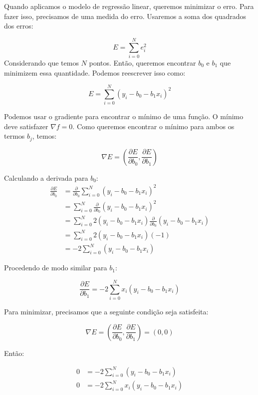 Quando aplicamos o modelo de regressão linear, queremos minimizar o erro. Para fazer isso, precisamos de uma medida do erro. Usaremos a soma dos quadrados dos erros:

$$E=\sum_{i=0}^{N}e_{i}^{2}$$
Considerando que temos $N$ pontos. Então, queremos encontrar $b_{0}$ e $b_{1}$ que minimizem essa quantidade. Podemos reescrever isso como:

$$E=\sum_{i=0}^{N}\left(y_{i}-b_{0}-b_{1}x_{i}\right)^{2}$$

Podemos usar o gradiente para encontrar o mínimo de uma função. O mínimo deve satisfazer $\nabla f=0$. Como queremos encontrar o mínimo para ambos os termos $b_j$, temos:

$$\nabla E=\left(\frac{\partial E}{\partial b_{0}},\frac{\partial E}{\partial b_{1}}\right)$$

Calculando a derivada para $b_0$:
\begin{equation}
    \begin{split}
        \frac{\partial E}{\partial b_{0}}	& =\frac{\partial}{\partial b_{0}}\sum_{i=0}^{N}\left(y_{i}-b_{0}-b_{1}x_{i}\right)^{2} \\
    	&=\sum_{i=0}^{N}\frac{\partial}{\partial b_{0}}\left(y_{i}-b_{0}-b_{1}x_{i}\right)^{2}\\
    	&=\sum_{i=0}^{N}2\left(y_{i}-b_{0}-b_{1}x_{i}\right)\frac{\partial}{\partial b_{0}}\left(y_{i}-b_{0}-b_{1}x_{i}\right)\\
    	&=\sum_{i=0}^{N}2\left(y_{i}-b_{0}-b_{1}x_{i}\right)\left(-1\right)\\
    	&=-2\sum_{i=0}^{N}\left(y_{i}-b_{0}-b_{1}x_{i}\right)
    \end{split}
\end{equation}

Procedendo de modo similar para $b_1$:

$$\frac{\partial E}{\partial b_{1}}=-2\sum_{i=0}^{N}x_{i}\left(y_{i}-b_{0}-b_{1}x_{i}\right)$$

Para minimizar, precisamos que a seguinte condição seja satisfeita:

$$\nabla E=\left(\frac{\partial E}{\partial b_{0}},\frac{\partial E}{\partial b_{1}}\right)=\left(0,0\right)$$

Então:

\begin{equation}
    \begin{split}
        0&	=-2\sum_{i=0}^{N}\left(y_{i}-b_{0}-b_{1}x_{i}\right)\\
        0	&=-2\sum_{i=0}^{N}x_{i}\left(y_{i}-b_{0}-b_{1}x_{i}\right)\\
    \end{split}
    \label{linear 1}
\end{equation}

